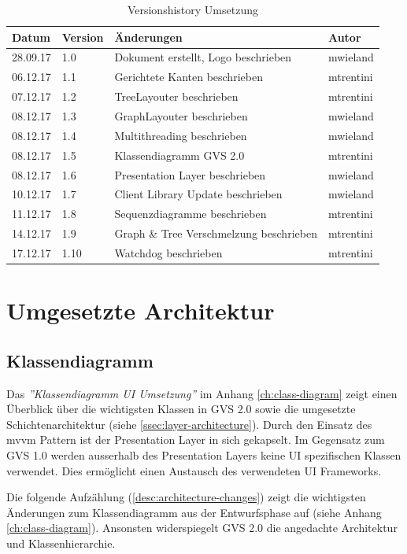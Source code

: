\documentclass[11pt,a4paper,english,oneside]{book}
\numberwithin{equation}{chapter}
\begin{document}
	\begin{table}[h!]
	\centering
	\begin{tabularx}{\linewidth}{l l X l}
		\toprule 
		Datum & Version & Änderungen & Autor \\
		\midrule
		28.09.17 & 1.0 & Dokument erstellt, Logo beschrieben & mwieland \\
		06.12.17 & 1.1 & Gerichtete Kanten beschrieben & mtrentini \\
		07.12.17 & 1.2 & TreeLayouter beschrieben & mtrentini \\
		08.12.17 & 1.3 & GraphLayouter beschrieben & mwieland \\
		08.12.17 & 1.4 & Multithreading beschrieben & mwieland \\
		08.12.17 & 1.5 & Klassendiagramm GVS 2.0 & mtrentini \\
		08.12.17 & 1.6 & Presentation Layer beschrieben & mwieland \\
		10.12.17 & 1.7 & Client Library Update beschrieben & mwieland \\
		11.12.17 & 1.8 & Sequenzdiagramme beschrieben & mtrentini \\
		14.12.17 & 1.9 & Graph \& Tree Verschmelzung beschrieben & mtrentini \\
		17.12.17 & 1.10 & Watchdog beschrieben & mtrentini \\
		\bottomrule 
	\end{tabularx} 
	\caption{Versionshistory Umsetzung} 
	\end{table}



	\section{Umgesetzte Architektur}
	
	\subsection{Klassendiagramm}
	Das \textit{''Klassendiagramm UI Umsetzung''} im Anhang \ref{ch:class-diagram} zeigt einen Überblick über die wichtigsten Klassen in GVS 2.0 sowie die umgesetzte Schichtenarchitektur (siehe \ref{ssec:layer-architecture}). Durch den Einsatz des \gls{mvvm} Pattern ist der Presentation Layer in sich gekapselt. Im Gegensatz zum GVS 1.0 werden ausserhalb des Presentation Layers keine UI spezifischen Klassen verwendet. Dies ermöglicht einen Austausch des verwendeten UI Frameworks.
	

	\noindent
	Die folgende Aufzählung (\ref{desc:architecture-changes}) zeigt die wichtigsten Änderungen zum Klassendiagramm aus der Entwurfsphase auf (siehe Anhang \ref{ch:class-diagram}). Ansonsten widerspiegelt GVS 2.0 die angedachte Architektur und Klassenhierarchie.
	
\end{document}
